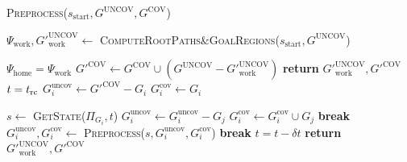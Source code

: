 \begin{algorithm}
\caption{\textsc{Preprocess}($s_{\textrm{start}},G^{\textrm{UNCOV}},G^{\textrm{COV}}$)}\label{alg:2}
\begin{algorithmic}[1]
\State $\Psi_{\textrm{work}}, G'^{\textrm{UNCOV}}_{\textrm{work}} \leftarrow$ \textsc{ComputeRootPaths\&GoalRegions}($s_{\textrm{start}},G^{\textrm{UNCOV}}$)

    \State $\Psi_{\textrm{home}} = \Psi_{\textrm{work}}$
\EndIf
\State $G'^{\textrm{COV}} \leftarrow G^{\textrm{COV}} \cup (G^{\textrm{UNCOV}} - G'^{\textrm{UNCOV}}_{\textrm{work}})$
    \State \textbf{return} $G'^{\textrm{UNCOV}}_{\textrm{work}}, G'^{\textrm{COV}}$
\EndIf
{}
    \State $t = t_{\textrm{rc}}$
    \State $G_i^{\textrm{uncov}} \leftarrow G'^{\textrm{COV}} - G_i$
    \State $G_i^{\textrm{cov}} \leftarrow G_i$

    
        \State $s \leftarrow$ \textsc{GetState($\Pi_{G_i}, t$)}
                \State $G_i^{\textrm{uncov}} \leftarrow G_i^{\textrm{uncov}} - G_j$
                \State $G_i^{\textrm{cov}} \leftarrow G_i^{\textrm{cov}} \cup G_j$
            \EndIf
        \EndFor
            \State \textbf{break}
        \EndIf
        \State $G_i^{\textrm{uncov}},G_i^{\textrm{cov}} \leftarrow$ \textsc{Preprocess}($s,G_i^{\textrm{uncov}},G_i^{\textrm{cov}}$)
            \State \textbf{break}
        \EndIf
        \State $t = t - \delta t$
    \EndWhile
\EndFor
\State \textbf{return} $G'^{\textrm{UNCOV}}_{\textrm{work}}, G'^{\textrm{COV}}$

\end{algorithmic}
\end{algorithm}

